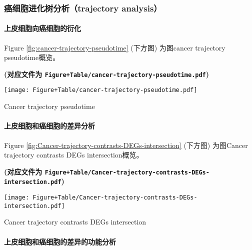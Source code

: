 \documentclass[
]{article}
\begin{document}
\hypertarget{ux764cux7ec6ux80deux8fdbux5316ux6811ux5206ux6790trajectory-analysis}{%
\subsubsection{癌细胞进化树分析（trajectory analysis）}\label{ux764cux7ec6ux80deux8fdbux5316ux6811ux5206ux6790trajectory-analysis}}

\hypertarget{ux4e0aux76aeux7ec6ux80deux5411ux764cux7ec6ux80deux7684ux884dux5316}{%
\paragraph{上皮细胞向癌细胞的衍化}\label{ux4e0aux76aeux7ec6ux80deux5411ux764cux7ec6ux80deux7684ux884dux5316}}

Figure \ref{fig:cancer-trajectory-pseudotime} (下方图) 为图cancer trajectory pseudotime概览。

\textbf{(对应文件为 \texttt{Figure+Table/cancer-trajectory-pseudotime.pdf})}

\def\@captype{figure}
\begin{center}
\texttt{[image: Figure+Table/cancer-trajectory-pseudotime.pdf]}
\caption{Cancer trajectory pseudotime}\label{fig:cancer-trajectory-pseudotime}
\end{center}

\hypertarget{ux4e0aux76aeux7ec6ux80deux548cux764cux7ec6ux80deux7684ux5deeux5f02ux5206ux6790}{%
\paragraph{上皮细胞和癌细胞的差异分析}\label{ux4e0aux76aeux7ec6ux80deux548cux764cux7ec6ux80deux7684ux5deeux5f02ux5206ux6790}}

Figure \ref{fig:Cancer-trajectory-contrasts-DEGs-intersection} (下方图) 为图Cancer trajectory contrasts DEGs intersection概览。

\textbf{(对应文件为 \texttt{Figure+Table/Cancer-trajectory-contrasts-DEGs-intersection.pdf})}

\def\@captype{figure}
\begin{center}
\texttt{[image: Figure+Table/Cancer-trajectory-contrasts-DEGs-intersection.pdf]}
\caption{Cancer trajectory contrasts DEGs intersection}\label{fig:Cancer-trajectory-contrasts-DEGs-intersection}
\end{center}

\hypertarget{ux4e0aux76aeux7ec6ux80deux548cux764cux7ec6ux80deux7684ux5deeux5f02ux7684ux529fux80fdux5206ux6790}{%
\paragraph{上皮细胞和癌细胞的差异的功能分析}\label{ux4e0aux76aeux7ec6ux80deux548cux764cux7ec6ux80deux7684ux5deeux5f02ux7684ux529fux80fdux5206ux6790}}
\end{document}
